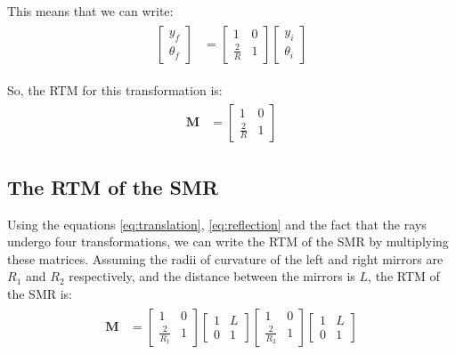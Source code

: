 \documentclass[12pt]{article}
\begin{document}
This means that we can write:
\begin{align}
    \begin{split}
        \begin{bmatrix}
            y_f \\
            \theta_f
        \end{bmatrix} & = \begin{bmatrix}
            1           & 0 \\
            \frac{2}{R} & 1
        \end{bmatrix} \begin{bmatrix}
            y_i \\
            \theta_i
        \end{bmatrix}
    \end{split}
\end{align}

So, the RTM for this transformation is:
\begin{align}
    \label{eq:reflection}
    \begin{split}
        \mathbf{M} & = \begin{bmatrix}
            1           & 0 \\
            \frac{2}{R} & 1
        \end{bmatrix}
    \end{split}
\end{align}

\subsection{The RTM of the SMR}
Using the equations \ref{eq:translation}, \ref{eq:reflection} and the fact that the rays undergo four transformations, we can write the RTM of the SMR by multiplying these matrices. Assuming the radii of curvature of the left and right mirrors are \(R_1\) and \(R_2\) respectively, and the distance between the mirrors is \(L\), the RTM of the SMR is:
\begin{align}
    \label{fig:RTM-SMR}
    \begin{split}
        \mathbf{M} & = \begin{bmatrix}
            1             & 0 \\
            \frac{2}{R_1} & 1
        \end{bmatrix}
        \begin{bmatrix}
            1 & L \\
            0 & 1
        \end{bmatrix}
        \begin{bmatrix}
            1             & 0 \\
            \frac{2}{R_2} & 1
        \end{bmatrix}
        \begin{bmatrix}
            1 & L \\
            0 & 1
        \end{bmatrix}
    \end{split}
\end{align}
\end{document}

